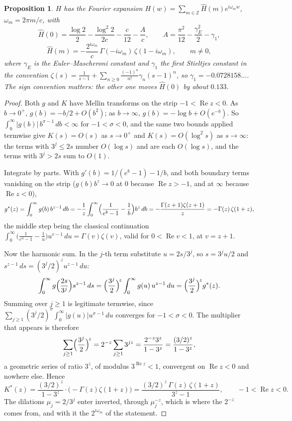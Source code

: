 \documentclass[11pt]{article}
\newtheorem{proposition}[theorem]{Proposition}
\theoremstyle{definition}
\theoremstyle{remark}
\newcommand{\Z}{\mathbb{Z}}
\begin{document}
\begin{proposition}
\label{prop:Hfourier}
$H$ has the Fourier expansion $H(w) = \sum_{m\in\Z} \hat H(m) e^{i\omega_m w}$, $\omega_m =
2\pi m/c$, with
\[
\hat H(0) = \frac{\log 2}{2} - \frac{\log^2 2}{2c} - \frac{c}{12} - \frac{A}{c}, \qquad
A = \frac{\pi^2}{12} - \frac{\gamma_E^2}{2} - \gamma_1,
\]
\[
\hat H(m) = -\frac{2^{i\omega_m}}{c}\, \Gamma(-i\omega_m)\, \zeta(1-i\omega_m), \qquad m \ne 0,
\]
where $\gamma_E$ is the Euler--Mascheroni constant and $\gamma_1$ the first Stieltjes constant in
the convention
$\zeta(s)=\tfrac1{s-1}+\sum_{n\ge0}\tfrac{(-1)^n}{n!}\gamma_n(s-1)^n$, so
$\gamma_1=-0.0728158\ldots$. The sign convention matters: the other one moves $\hat H(0)$ by about
$0.133$.
\end{proposition}

\begin{proof}
Both $g$ and $K$ have Mellin transforms on the strip $-1<\operatorname{Re}z<0$. As $b\to0^+$,
$g(b)=-b/2+O(b^2)$; as $b\to\infty$, $g(b)=-\log b+O(e^{-b})$. So $\int_0^\infty
|g(b)|\,b^{\sigma-1}\,db<\infty$ for $-1<\sigma<0$, and the same two bounds applied termwise give
$K(s)=O(s)$ as $s\to0^+$ and $K(s)=O(\log^2 s)$ as $s\to\infty$: the terms with $3^j\le2s$ number
$O(\log s)$ and are each $O(\log s)$, and the terms with $3^j>2s$ sum to $O(1)$.

Integrate by parts. With $g'(b)=1/(e^b-1)-1/b$, and both boundary terms vanishing on the strip
($g(b)b^z\to0$ at $0$ because $\operatorname{Re}z>-1$, and at $\infty$ because
$\operatorname{Re}z<0$),
\[
g^*(z) = \int_0^\infty g(b)\,b^{z-1}\,db = -\frac1z\int_0^\infty\Bigl(\frac{1}{e^b-1}-\frac1b\Bigr)b^z\,db
= -\frac{\Gamma(z+1)\zeta(z+1)}{z} = -\Gamma(z)\,\zeta(1+z),
\]
the middle step being the classical continuation
$\int_0^\infty\bigl(\tfrac{1}{e^u-1}-\tfrac1u\bigr)u^{v-1}\,du=\Gamma(v)\zeta(v)$, valid for
$0<\operatorname{Re}v<1$, at $v=z+1$.

Now the harmonic sum. In the $j$-th term substitute $u=2s/3^j$, so $s=3^ju/2$ and
$s^{z-1}\,ds=(3^j/2)^z u^{z-1}\,du$:
\[
\int_0^\infty g\Bigl(\frac{2s}{3^j}\Bigr)s^{z-1}\,ds = \Bigl(\frac{3^j}{2}\Bigr)^{\!z}\int_0^\infty
g(u)\,u^{z-1}\,du = \Bigl(\frac{3^j}{2}\Bigr)^{\!z} g^*(z).
\]
Summing over $j\ge1$ is legitimate termwise, since $\sum_{j\ge1}(3^j/2)^\sigma\int_0^\infty
|g(u)|u^{\sigma-1}\,du$ converges for $-1<\sigma<0$. The multiplier that appears is therefore
\[
\sum_{j\ge1}\Bigl(\frac{3^j}{2}\Bigr)^{\!z} = 2^{-z}\sum_{j\ge1}3^{jz} = \frac{2^{-z}3^z}{1-3^z}
= \frac{(3/2)^z}{1-3^z},
\]
a geometric series of ratio $3^z$, of modulus $3^{\operatorname{Re}z}<1$, convergent on
$\operatorname{Re}z<0$ and nowhere else. Hence
\begin{equation}
\label{eq:Kstar}
K^*(z) = \frac{(3/2)^z}{1-3^z}\cdot\bigl(-\Gamma(z)\zeta(1+z)\bigr)
= \frac{(3/2)^z\,\Gamma(z)\,\zeta(1+z)}{3^z-1}, \qquad -1<\operatorname{Re}z<0.
\end{equation}
The dilations $\mu_j=2/3^j$ enter inverted, through $\mu_j^{-z}$, which is where the $2^{-z}$ comes
from, and with it the $2^{i\omega_m}$ of the statement.


\end{proof}
\end{document}
